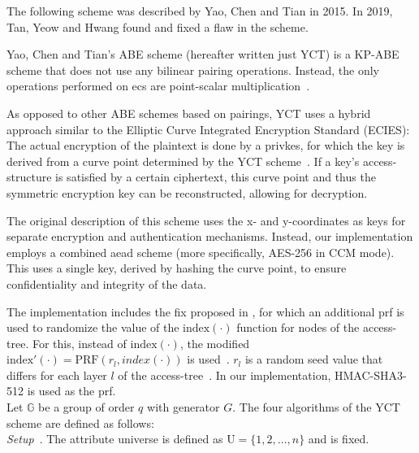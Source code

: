 The following scheme was described by Yao, Chen and Tian \cite{yao_lightweight_2015} in 2015.
In 2019, Tan, Yeow and Hwang \cite{tan_enhancement_2019} found and fixed a flaw in the scheme.

Yao, Chen and Tian's ABE scheme (hereafter written just YCT) is a KP-ABE scheme that does not use any bilinear pairing operations.
Instead, the only operations performed on \glspl{ec} are point-scalar multiplication~\cite{yao_lightweight_2015}.

As opposed to other ABE schemes based on pairings, YCT uses a hybrid approach similar to the Elliptic Curve Integrated Encryption Standard (ECIES):
The actual encryption of the plaintext is done by a \gls{privkes}, for which the key is derived from a curve point determined by the YCT scheme~\cite{yao_lightweight_2015}.
If a key's \gls{access-structure} is satisfied by a certain ciphertext, this curve point and thus the symmetric encryption key can be reconstructed, allowing for decryption.

The original description of this scheme uses the x- and y-coordinates as keys for separate encryption and authentication mechanisms.
Instead, our implementation employs a combined \acrfull{aead} scheme (more specifically, AES-256 in CCM mode).
This uses a single key, derived by hashing the curve point, to ensure confidentiality and integrity of the data.

The implementation includes the fix proposed in \cite{tan_enhancement_2019}, for which an additional \acrfull{prf} is used to randomize the value of the $\text{index}(\cdot)$ function for nodes of the \gls{access-tree}.
For this, instead of $\text{index}(\cdot)$, the modified $\text{index}'(\cdot) = \text{PRF}(r_l, index(\cdot))$ is used~\cite{tan_enhancement_2019}.
$r_l$ is a random seed value that differs for each layer $l$ of the \gls{access-tree}~\cite{tan_enhancement_2019}.
In our implementation, HMAC-SHA3-512 is used as the \acrshort{prf}.\\

Let $\mathbb{G}$ be a group of order $q$ with generator $G$. The four algorithms of the YCT scheme are defined as follows:
\\

\noindent \emph{Setup}~\cite{yao_lightweight_2015}.
The attribute universe is defined as $\text{U} = \{1, 2, \dots, n\}$ and is fixed.

